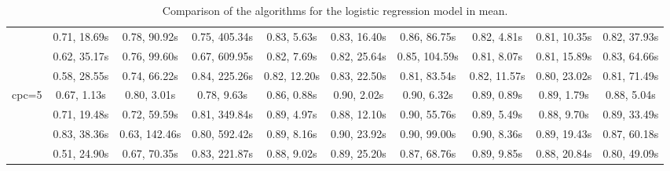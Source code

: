 \documentclass[article]{jss}\usepackage[]{graphicx}\usepackage[]{xcolor}
\begin{document}
\begin{landscape}
\begin{table}[t!]
\begin{tabular}{@{}cccccccccc@{}}
                           & 0.71, 18.69s & 0.78, 90.92s & 0.75, 405.34s & 0.83, 5.63s & 0.83, 16.40s & 0.86, 86.75s & 0.82, 4.81s & 0.81, 10.35s & 0.82, 37.93s \\
                           & 0.62, 35.17s & 0.76, 99.60s & 0.67, 609.95s & 0.82, 7.69s & 0.82, 25.64s & 0.85, 104.59s & 0.81, 8.07s & 0.81, 15.89s & 0.83, 64.66s \\
                           & 0.58, 28.55s & 0.74, 66.22s & 0.84, 225.26s & 0.82, 12.20s & 0.83, 22.50s & 0.81, 83.54s & 0.82, 11.57s & 0.80, 23.02s & 0.81, 71.49s \\ \midrule
    \multirow{4}{*}{cpc=5} & 0.67, 1.13s & 0.80, 3.01s & 0.78, 9.63s & 0.86, 0.88s & 0.90, 2.02s & 0.90, 6.32s & 0.89, 0.89s & 0.89, 1.79s & 0.88, 5.04s \\
                           & 0.71, 19.48s & 0.72, 59.59s & 0.81, 349.84s & 0.89, 4.97s & 0.88, 12.10s & 0.90, 55.76s & 0.89, 5.49s & 0.88, 9.70s & 0.89, 33.49s \\
                           & 0.83, 38.36s & 0.63, 142.46s & 0.80, 592.42s & 0.89, 8.16s & 0.90, 23.92s & 0.90, 99.00s & 0.90, 8.36s & 0.89, 19.43s & 0.87, 60.18s \\
                           & 0.51, 24.90s & 0.67, 70.35s & 0.83, 221.87s & 0.88, 9.02s & 0.89, 25.20s & 0.87, 68.76s & 0.89, 9.85s & 0.88, 20.84s & 0.80, 49.09s \\ \bottomrule
    \end{tabular}
    \caption{\label{tab:logistic regression comparison} Comparison of the algorithms for the logistic regression model in mean.}
  \end{table}

\end{landscape}
\restoregeometry

\end{document}
